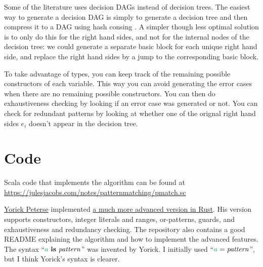 \documentclass[a4paper, 11pt]{article}
\theoremstyle{definition}
\begin{document}
Some of the literature uses decision DAGs instead of decision trees. The easiest way to generate a decision DAG is simply to generate a decision tree and then compress it to a DAG using hash consing \cite{maranget_compiling_2008}. A simpler though less optimal solution is to only do this for the right hand sides, and not for the internal nodes of the decision tree: we could generate a separate basic block for each unique right hand side, and replace the right hand sides by a jump to the corresponding basic block.

To take advantage of types, you can keep track of the remaining possible constructors of each variable. This way you can avoid generating the error cases when there are no remaining possible constructors. You can then do exhaustiveness checking by looking if an error case was generated or not. You can check for redundant patterns by looking at whether one of the orignal right hand sides $e_i$ doesn't appear in the decision tree.

\section{Code}

Scala code that implements the algorithm can be found at \\ \url{https://julesjacobs.com/notes/patternmatching/pmatch.sc}

\medskip

\noindent
\href{https://yorickpeterse.com/}{Yorick Peterse} implemented \href{https://gitlab.com/yorickpeterse/pattern-matching-in-rust/-/tree/main/jacobs2021}{a much more advanced version in Rust}.
His version supports constructors, integer literals and ranges, or-patterns, guards, and exhaustiveness and redundancy checking.
The repository also contains a good README explaining the algorithm and how to implement the advanced features.
The syntax ``$\ba \is \patt$'' was invented by Yorick. I initially used ``$\ba = \patt$'', but I think Yorick's syntax is clearer.

\nocite{*}


\end{document}
